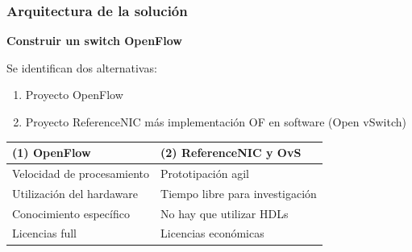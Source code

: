 \documentclass{beamer}
\begin{document}
\begin{frame}
\frametitle{Arquitectura de la soluci\'on} 

\textbf{Construir un switch OpenFlow} 

\vspace{0.3cm}
Se identifican dos alternativas: 
\begin{enumerate}
\item Proyecto OpenFlow
\item Proyecto ReferenceNIC m\'as implementaci\'on OF en software (Open vSwitch)
\end{enumerate}

\begin{table}[]
\small
\centering
\label{label}
\begin{tabular}{| p{5cm} | p{5cm} |}

\hline
\multicolumn{1}{|l|}{(1) OpenFlow } & \multicolumn{1}{l|}{(2) ReferenceNIC y OvS } \\
\hline
Velocidad de procesamiento & Prototipaci\'on agil \\
Utilizaci\'on del hardaware &  Tiempo libre para investigaci\'on \\
Conocimiento espec\'ifico &  No hay que utilizar HDLs \\
Licencias full &  Licencias econ\'omicas \\

\hline  
\end{tabular}
\end{table}
\end{frame}
\end{document}
